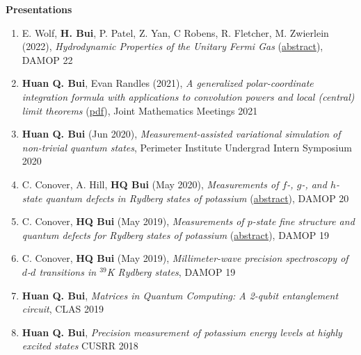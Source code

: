 \documentclass[10pt]{article}
\begin{document}

\noindent \large{\textbf{{Presentations}}}  \normalsize 

\begin{enumerate}
	\setlength\itemsep{-0pt}
	\item E. Wolf, \textbf{H. Bui}, P. Patel, Z. Yan, C Robens, R. Fletcher, M. Zwierlein (2022), \textit{Hydrodynamic Properties of the Unitary Fermi Gas} (\href{https://meetings.aps.org/Meeting/DAMOP22/Session/N01.49}{abstract}), DAMOP 22
	
	\item \textbf{Huan Q. Bui}, Evan Randles (2021), \textit{A generalized polar-coordinate integration formula with applications to convolution powers and local (central) limit theorems} (\href{https://jointmathematicsmeetings.org/amsmtgs/2247_abstracts/1163-42-1122.pdf}{{pdf}}), Joint Mathematics Meetings 2021
	
	\item \textbf{Huan Q. Bui} (Jun 2020), \textit{Measurement-assisted variational simulation of non-trivial quantum states},
	Perimeter Institute Undergrad Intern Symposium 2020
	
	\item C. Conover, A. Hill, \textbf{HQ Bui} (May 2020), \textit{Measurements of $f$-, $g$-, and $h$-state quantum defects in Rydberg states of potassium} (\href{http://meetings.aps.org/Meeting/DAMOP20/Session/K01.17}{abstract}),  DAMOP 20
	
	\item C. Conover, \textbf{HQ Bui} (May 2019), \textit{Measurements of $p$-state fine structure and quantum defects for Rydberg states of potassium} (\href{https://ui.adsabs.harvard.edu/abs/2019APS..DMPL01169C/abstract}{{abstract}}), DAMOP 19
	
	\item C. Conover, \textbf{HQ Bui} (May 2019), \textit{Millimeter-wave precision spectroscopy of $d$-$d$ transitions in $^{\text{39}}$K Rydberg states},
	DAMOP 19
	
	\item \textbf{Huan Q. Bui}, \textit{Matrices in Quantum Computing: A 2-qubit entanglement circuit},
	CLAS 2019
	
	\item \textbf{Huan Q. Bui}, \textit{Precision measurement of potassium energy levels at highly excited states} 
	CUSRR 2018
\end{enumerate}
\end{document}
